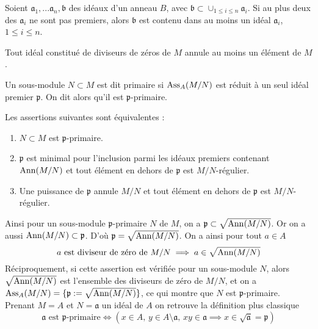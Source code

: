 \begin{prop}
Soient $\mathfrak{a}_1,...\mathfrak{a}_n, \mathfrak{b}$ des idéaux d'un anneau $B$, avec $\mathfrak{b}\subset \cup_{1\leq i\leq n}\mathfrak{a}_i$. Si au plus deux des $\mathfrak{a}_i$ ne sont pas premiers, alors $\mathfrak{b}$ est contenu dans au moins un idéal $\mathfrak{a}_i$, $1\leq i\leq n$.
\end{prop}

\begin{cor}\label{AssociatedPrimesProp2}
Tout idéal constitué de diviseurs de zéros de $M$ annule au moins un élément de $M$.
\end{cor}

\begin{defn}
Un sous-module $N\subset M$ est dit primaire si $\operatorname{Ass}_A(M/N)$ est réduit à un seul idéal premier $\mathfrak{p}$. On dit alors qu'il est $\mathfrak{p}$-primaire.
\end{defn}

\begin{prop}
Les assertions suivantes sont équivalentes :
\begin{enumerate}
\item $N\subset M$ est $\mathfrak{p}$-primaire.
\item $\mathfrak{p}$ est minimal pour l'inclusion parmi les idéaux premiers contenant $\operatorname{Ann}(M/N)$ et tout élément en dehors de $\mathfrak{p}$ est $M/N$-régulier.
\item Une puissance de $\mathfrak{p}$ annule $M/N$ et tout élément en dehors de $\mathfrak{p}$ est $M/N$-régulier.
\end{enumerate}
\end{prop}

\begin{rem}
Ainsi pour un sous-module $\mathfrak{p}$-primaire $N$ de $M$, on a $\mathfrak{p}\subset \sqrt{\operatorname{Ann}(M/N)}$. Or on a aussi $\operatorname{Ann}(M/N)\subset \mathfrak{p}$. D'où $\mathfrak{p}=\sqrt{\operatorname{Ann}(M/N)}$. On a ainsi pour tout $a\in A$
$$a\text{ est diviseur de zéro de } M/N \implies a\in\sqrt{\operatorname{Ann}(M/N)}$$
Réciproquement, si cette assertion est vérifiée pour un sous-module $N$, alors $\sqrt{\operatorname{Ann}(M/N)}$ est l'ensemble des diviseurs de zéro de $M/N$, et on a $\operatorname{Ass}_A(M/N)=\lbrace \mathfrak{p}:=\sqrt{\operatorname{Ann}(M/N)}\rbrace$, ce qui montre que $N$ est $\mathfrak{p}$-primaire. Prenant $M=A$ et $N=\mathfrak{a}$ un idéal de $A$ on retrouve la définition plus classique
$$\mathfrak{a}\text{ est }\mathfrak{p}\text{-primaire} \iff (x\in A,\, y\in A\setminus\mathfrak{a},\,xy\in\mathfrak{a}\implies x\in \sqrt{\mathfrak{a}}=\mathfrak{p})$$
\end{rem}

